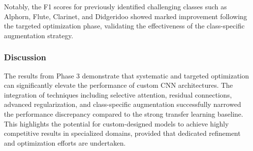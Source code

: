 Notably, the F1 scores for previously identified challenging classes such as Alphorn, Flute, Clarinet, and Didgeridoo showed marked improvement following the targeted optimization phase, validating the effectiveness of the class-specific augmentation strategy.

\subsubsection{Discussion}
The results from Phase 3 demonstrate that systematic and targeted optimization can significantly elevate the performance of custom CNN architectures. The integration of techniques including selective attention, residual connections, advanced regularization, and class-specific augmentation successfully narrowed the performance discrepancy compared to the strong transfer learning baseline. This highlights the potential for custom-designed models to achieve highly competitive results in specialized domains, provided that dedicated refinement and optimization efforts are undertaken.
